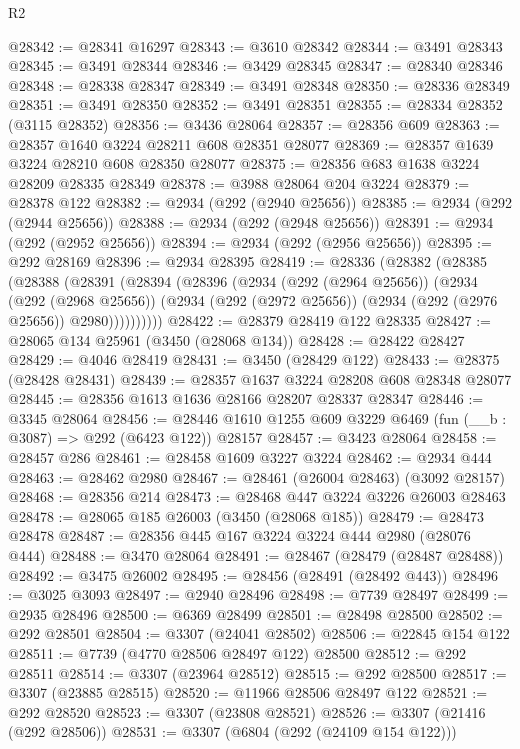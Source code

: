 \begin{lexlean}{R2}
\begin{coremodule}
@28342 := @28341 @16297
@28343 := @3610 @28342
@28344 := @3491 @28343
@28345 := @3491 @28344
@28346 := @3429 @28345
@28347 := @28340 @28346
@28348 := @28338 @28347
@28349 := @3491 @28348
@28350 := @28336 @28349
@28351 := @3491 @28350
@28352 := @3491 @28351
@28355 := @28334 @28352 (@3115 @28352)
@28356 := @3436 @28064
@28357 := @28356 @609
@28363 := @28357 @1640 @3224 @28211 @608 @28351 @28077
@28369 := @28357 @1639 @3224 @28210 @608 @28350 @28077
@28375 := @28356 @683 @1638 @3224 @28209 @28335 @28349
@28378 := @3988 @28064 @204 @3224
@28379 := @28378 @122
@28382 := @2934 (@292 (@2940 @25656))
@28385 := @2934 (@292 (@2944 @25656))
@28388 := @2934 (@292 (@2948 @25656))
@28391 := @2934 (@292 (@2952 @25656))
@28394 := @2934 (@292 (@2956 @25656))
@28395 := @292 @28169
@28396 := @2934 @28395
@28419 := @28336
    (@28382
      (@28385
        (@28388
          (@28391
            (@28394
              (@28396
                (@2934
                  (@292 (@2964 @25656))
                  (@2934
                    (@292 (@2968 @25656))
                    (@2934 (@292 (@2972 @25656)) (@2934 (@292 (@2976 @25656)) @2980))))))))))
@28422 := @28379 @28419 @122 @28335
@28427 := @28065 @134 @25961 (@3450 (@28068 @134))
@28428 := @28422 @28427
@28429 := @4046 @28419
@28431 := @3450 (@28429 @122)
@28433 := @28375 (@28428 @28431)
@28439 := @28357 @1637 @3224 @28208 @608 @28348 @28077
@28445 := @28356 @1613 @1636 @28166 @28207 @28337 @28347
@28446 := @3345 @28064
@28456 := @28446 @1610 @1255 @609 @3229 @6469 (fun (__b : @3087) => @292 (@6423 @122)) @28157
@28457 := @3423 @28064
@28458 := @28457 @286
@28461 := @28458 @1609 @3227 @3224
@28462 := @2934 @444
@28463 := @28462 @2980
@28467 := @28461 (@26004 @28463) (@3092 @28157)
@28468 := @28356 @214
@28473 := @28468 @447 @3224 @3226 @26003 @28463
@28478 := @28065 @185 @26003 (@3450 (@28068 @185))
@28479 := @28473 @28478
@28487 := @28356 @445 @167 @3224 @3224 @444 @2980 (@28076 @444)
@28488 := @3470 @28064
@28491 := @28467 (@28479 (@28487 @28488))
@28492 := @3475 @26002
@28495 := @28456 (@28491 (@28492 @443))
@28496 := @3025 @3093
@28497 := @2940 @28496
@28498 := @7739 @28497
@28499 := @2935 @28496
@28500 := @6369 @28499
@28501 := @28498 @28500
@28502 := @292 @28501
@28504 := @3307 (@24041 @28502)
@28506 := @22845 @154 @122
@28511 := @7739 (@4770 @28506 @28497 @122) @28500
@28512 := @292 @28511
@28514 := @3307 (@23964 @28512)
@28515 := @292 @28500
@28517 := @3307 (@23885 @28515)
@28520 := @11966 @28506 @28497 @122
@28521 := @292 @28520
@28523 := @3307 (@23808 @28521)
@28526 := @3307 (@21416 (@292 @28506))
@28531 := @3307 (@6804 (@292 (@24109 @154 @122)))

\end{coremodule}
\end{lexlean}
